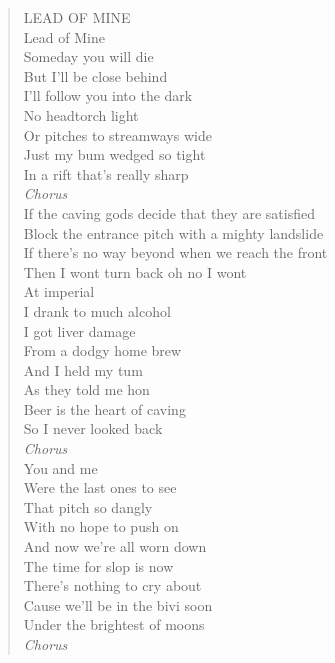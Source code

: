 \begin{verse} \centering
LEAD OF MINE \\
 \vspace{0.3cm}
Lead of Mine \\
Someday you will die \\
But I'll be close behind \\
I'll follow you into the dark \\
 \vspace{0.3cm}
No headtorch light \\
Or pitches to streamways wide \\
Just my bum wedged so tight \\
In a rift that's really sharp \\
  \vspace{0.3cm}
\textit{Chorus}\\
 \vspace{0.3cm}
If the caving gods decide that they are satisfied \\
Block the entrance pitch with a mighty landslide \\
If there's no way beyond when we reach the front \\
Then I wont turn back oh no I wont \\
  \vspace{0.3cm}
At imperial \\
I drank to much alcohol \\
I got liver damage \\
From a dodgy home brew \\ 
  \vspace{0.3cm}
And I held my tum \\
As they told me hon \\
Beer is the heart of caving \\
So I never looked back \\ 
  \vspace{0.3cm}
\textit{Chorus} \\ 
 \vspace{0.3cm}
You and me \\
Were the last ones to see \\
That pitch so dangly \\
With no hope to push on \\ 
  \vspace{0.3cm}
And now we're all worn down \\
The time for slop is now \\
There's nothing to cry about \\
Cause we'll be in the bivi soon \\
Under the brightest of moons \\ 
  \vspace{0.3cm}
\textit{Chorus} 

\end{verse}

